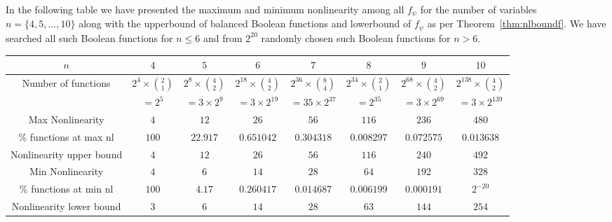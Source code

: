 \documentclass{llncs}
\begin{document}
\fi
In the following table we have presented the maximum and minimum nonlinearity among all $f_\psi$ for the number of variables $n = \{4, 5, \ldots, 10\}$ along with the upperbound of balanced Boolean functions and lowerbound of $f_{\psi}$ as per Theorem~\ref{thm:nlboundf}. We have searched all such Boolean functions for $n \leq 6$ and from $2^{20}$ randomly chosen such Boolean functions for $n > 6$.
\begin{center}
\begin{tabular}{|c|c|c|c||c|c|c|c|}\hline
$n$ & $4$ & $5$ & $6$ & $7$ & $8$ & $9$ & $10$\\ \hline
Number of functions & $2^4 \times \binom{2}{1}$ & $2^8 \times \binom{4}{2}$ & $2^{18} \times \binom{4}{2}$&$2^{36} \times \binom{8}{4}$&$2^{34} \times \binom{2}{1}$& $2^{68} \times \binom{4}{2}$& $2^{138} \times \binom{4}{2}$\\
& $ = 2^5$& $= 3\times 2^9$& $= 3\times 2^{19}$& $= 35\times 2^{37}$&$ = 2^{35}$&$= 3\times 2^{69}$& $= 3\times 2^{139}$\\ \hline
Max Nonlinearity & $4$ & $12$ & $26$ & $56$ & $116$ & $236$ & $480$\\ \hline
\% functions at max nl & $100$ & $22.917$ & $0.651042$ & $0.304318$ & $0.008297$ & $0.072575$ & $0.013638$\\ \hline
Nonlinearity upper bound & $4$ & $12$ & $26$ & $56$ & $116$ & $240$ & $492$\\ \hline
Min Nonlinearity & $4$ & $6$ & $14$ & $28$ & $64$ & $192$ & $328$\\ \hline
\% functions at min nl & $100$ & $4.17$ & $0.260417$ & $0.014687$ & $0.006199$ & $0.000191$ & $2^{-20}$\\ \hline
Nonlinearity lower bound & $3$ & $6$ & $14$ & $28$ & $63$ & $144$ & $254$\\ \hline
\end{tabular}
\end{center}
\end{document}
